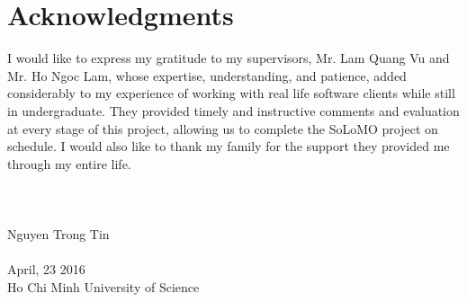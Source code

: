 \cleardoublepage
{}
{}
\chapter*{Acknowledgments}
\vspace{1.0in}
I would like to express my gratitude to my supervisors, Mr. Lam Quang Vu
and Mr. Ho Ngoc Lam, whose expertise, understanding, and patience,
added considerably to my experience of working with real life software clients while still in undergraduate. They provided timely and
instructive comments and evaluation at every stage of this project,
allowing us to complete the SoLoMO project on schedule.
I would also like to thank my family for the support they provided me
through my entire life.
\\
\\
\\ 
\\
Nguyen Trong Tin\\ 
\\
April, 23 2016\\
{Ho Chi Minh University of Science}\\
\newpage

